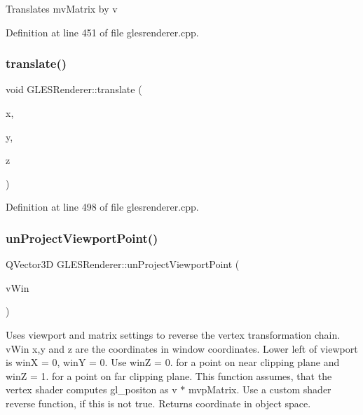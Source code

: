 Translates mv\+Matrix by v 

Definition at line 451 of file glesrenderer.\+cpp.

\mbox{\label{class_g_l_e_s_renderer_a45f1e6f0154b7887289fd8a3aa22908f}} 
\subsubsection{\texorpdfstring{translate()}{translate()}\hspace{0.1cm}{\footnotesize\ttfamily [2/2]}}
{\footnotesize\ttfamily void G\+L\+E\+S\+Renderer\+::translate (\begin{DoxyParamCaption}\item[{float}]{x,  }\item[{float}]{y,  }\item[{float}]{z }\end{DoxyParamCaption})}



Definition at line 498 of file glesrenderer.\+cpp.

\mbox{\label{class_g_l_e_s_renderer_a8be3d2a634d0fe1e13fb7b97673eefab}} 
\subsubsection{\texorpdfstring{unProjectViewportPoint()}{unProjectViewportPoint()}}
{\footnotesize\ttfamily Q\+Vector3D G\+L\+E\+S\+Renderer\+::un\+Project\+Viewport\+Point (\begin{DoxyParamCaption}\item[{const Q\+Vector3D \&}]{v\+Win }\end{DoxyParamCaption})}

Uses viewport and matrix settings to reverse the vertex transformation chain. v\+Win x,y and z are the coordinates in window coordinates. Lower left of viewport is winX = 0, winY = 0. Use winZ = 0. for a point on near clipping plane and winZ = 1. for a point on far clipping plane. This function assumes, that the vertex shader computes gl\+\_\+positon as v $\ast$ mvp\+Matrix. Use a custom shader reverse function, if this is not true. Returns coordinate in object space.

